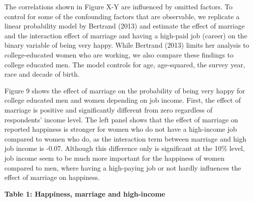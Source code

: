 \documentclass[]{article}
\begin{document}
The correlations shown in Figure X-Y are influenced by omitted factors.
To control for some of the confounding factors that are observable, we
replicate a linear probability model by Bertrand (2013) and estimate the
effect of marriage and the interaction effect of marriage and having a
high-paid job (career) on the binary variable of being very happy. While
Bertrand (2013) limits her analysis to college-educated women who are
working, we also compare these findings to college educated men. The
model controls for age, age-squared, the survey year, race and decade of
birth.

Figure 9 shows the effect of marriage on the probability of being very
happy for college educated men and women depending on job income. First,
the effect of marriage is positive and significantly different from zero
regardless of respondents' income level. The left panel shows that the
effect of marriage on reported happiness is stronger for women who do
not have a high-income job compared to women who do, as the interaction
term between marriage and high job income is -0.07. Although this
difference only is significant at the 10\% level, job income seem to be
much more important for the happiness of women compared to men, where
having a high-paying job or not hardly influences the effect of marriage
on happiness.

\textbf{Table 1: Happiness, marriage and high-income}
\end{document}
